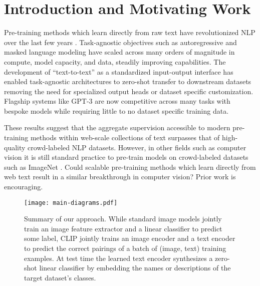 \documentclass{article}
\begin{document}
\section{Introduction and Motivating Work}



Pre-training methods which learn directly from raw text have revolutionized NLP over the last few years \citep{dai2015semi,peters2018deep,howard2018universal,radford2018improving,devlin2018bert,raffel2019exploring}. Task-agnostic objectives such as autoregressive and masked language modeling have scaled across many orders of magnitude in compute, model capacity, and data, steadily improving capabilities. The development of ``text-to-text'' as a standardized input-output interface \citep{mccann2018natural,radford2019language,raffel2019exploring} has enabled task-agnostic architectures to zero-shot transfer to downstream datasets removing the need for specialized output heads or dataset specific customization. Flagship systems like GPT-3 \citep{brown2020language} are now competitive across many tasks with bespoke models while requiring little to no dataset specific training data.

These results suggest that the aggregate supervision accessible to modern pre-training methods within web-scale collections of text surpasses that of high-quality crowd-labeled NLP datasets. However, in other fields such as computer vision it is still standard practice to pre-train models on crowd-labeled datasets such as ImageNet \citep{imagenet_cvpr09}. Could scalable pre-training methods which learn directly from web text result in a similar breakthrough in computer vision? Prior work is encouraging.


\begin{figure*}[ht]
\begin{center}
\centerline{\texttt{[image: main-diagrams.pdf]}}
\caption{Summary of our approach. While standard image models jointly train an image feature extractor and a linear classifier to predict some label, CLIP jointly trains an image encoder and a text encoder to predict the correct pairings of a batch of (image, text) training examples. At test time the learned text encoder synthesizes a zero-shot linear classifier by embedding the names or descriptions of the target dataset's classes.}
\label{main_fig}
\end{center}
\vspace{-1em}
\end{figure*}
\end{document}
